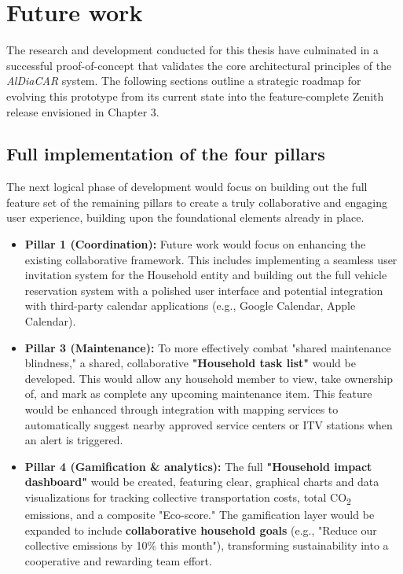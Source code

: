 \section{Future work}

The research and development conducted for this thesis have culminated in a successful proof-of-concept that validates the core architectural principles of the \textit{AlDiaCAR} system. The following sections outline a strategic roadmap for evolving this prototype from its current state into the feature-complete Zenith release envisioned in Chapter 3.

\subsection{Full implementation of the four pillars}

The next logical phase of development would focus on building out the full feature set of the remaining pillars to create a truly collaborative and engaging user experience, building upon the foundational elements already in place.

\begin{itemize}
\item \textbf{Pillar 1 (Coordination):} Future work would focus on enhancing the existing collaborative framework. This includes implementing a seamless user invitation system for the Household entity and building out the full vehicle reservation system with a polished user interface and potential integration with third-party calendar applications (e.g., Google Calendar, Apple Calendar).
\textgap
\item \textbf{Pillar 3 (Maintenance):} To more effectively combat "shared maintenance blindness," a shared, collaborative \textbf{"Household task list"} would be developed. This would allow any household member to view, take ownership of, and mark as complete any upcoming maintenance item. This feature would be enhanced through integration with mapping services to automatically suggest nearby approved service centers or ITV stations when an alert is triggered.
\textgap
\item \textbf{Pillar 4 (Gamification \& analytics):} The full \textbf{"Household impact dashboard"} would be created, featuring clear, graphical charts and data visualizations for tracking collective transportation costs, total CO\textsubscript{2} emissions, and a composite "Eco-score." The gamification layer would be expanded to include \textbf{collaborative household goals} (e.g., "Reduce our collective emissions by 10\% this month"), transforming sustainability into a cooperative and rewarding team effort.
\end{itemize}

